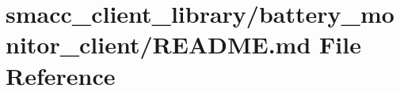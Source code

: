\hypertarget{smacc__client__library_2battery__monitor__client_2README_8md}{}\section{smacc\+\_\+client\+\_\+library/battery\+\_\+monitor\+\_\+client/\+R\+E\+A\+D\+ME.md File Reference}
\label{smacc__client__library_2battery__monitor__client_2README_8md}
